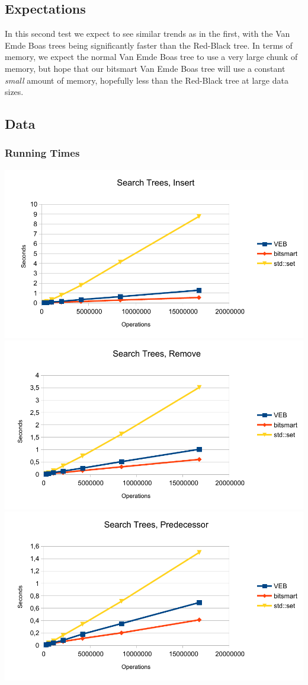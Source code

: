 \subsection{Expectations}

In this second test we expect to see similar trends as in the first, with the Van Emde Boas trees being significantly faster than the Red-Black tree. In terms of memory, we expect the normal Van Emde Boas tree to use a very large chunk of memory, but hope that our bitsmart Van Emde Boas tree will use a constant \textit{small} amount of memory, hopefully less than the Red-Black tree at large data sizes.

\subsection{Data}
\subsubsection{Running Times}
\includegraphics[width=\textwidth]{graphs/st_insert.pdf}
\includegraphics[width=\textwidth]{graphs/st_remove.pdf}
\includegraphics[width=\textwidth]{graphs/st_predecessor.pdf}

